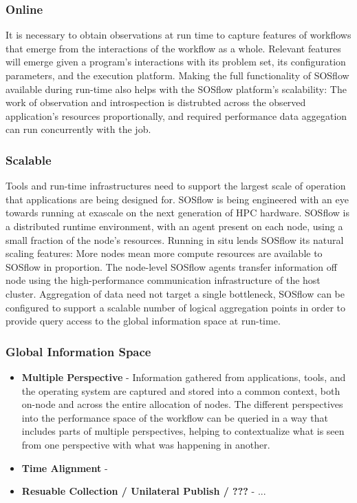 \subsubsection{Online}
%
It is necessary to obtain observations at run time to capture features
of workflows that emerge from the interactions of the workflow as a
whole.
%
Relevant features will emerge given a program's interactions
with its problem set, its configuration parameters, and the execution platform.
%
Making the full functionality of SOSflow available during run-time
also helps with the SOSflow platform's scalability: The work of
observation and introspection is distrubted across the observed
application's resources proportionally, and required performance data
aggegation can run concurrently with the job.
%
\subsubsection{Scalable}
%
Tools and run-time infrastructures need to support the largest scale of
operation that applications are being designed for.
%
SOSflow is being engineered with an eye towards running at exascale
on the next generation of HPC hardware.
%
SOSflow is a distributed runtime environment, with an agent present
on each node, using a small fraction of the node's resources.
%
Running in situ lends SOSflow its natural scaling features: More nodes
mean more compute resources are available to SOSflow in proportion.
%
The node-level SOSflow agents transfer information off node using
the high-performance communication infrastructure of the host cluster.
%
Aggregation of data need not target a single bottleneck, SOSflow can
be configured to support a scalable number of logical aggregation points
in order to provide query access to the global information space at
run-time.
%
\subsubsection{Global Information Space}
     \begin{itemize}
        \item \textbf{Multiple Perspective} - Information gathered from
          applications, tools, and the operating system are captured
          and stored into a common context, both on-node and across
          the entire allocation of nodes.  The different perspectives
          into the performance space of the workflow can be queried
          in a way that includes parts of multiple perspectives,
          helping to contextualize what is seen from one perspective
          with what was happening in another.
        \item \textbf{Time Alignment} - 
        \item \textbf{Resuable Collection / Unilateral Publish / ???} - ...
     \end{itemize}
